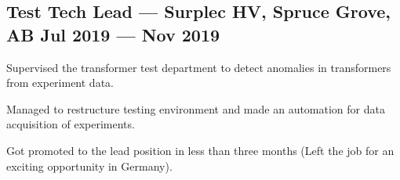 \documentclass[letter,11pt]{article}
\begin{document}
\subsection{{Test Tech Lead --- Surplec HV,  Spruce Grove, AB \hfill Jul 2019 --- Nov 2019}}
\begin{zitemize}
	\item Supervised the transformer test department to detect anomalies in transformers from experiment data.
		\item Managed to restructure testing environment and made an automation for data acquisition of experiments.
	\item Got promoted to the lead position in less than three months (Left the job for an exciting opportunity in Germany).
\end{zitemize}


\end{document}
